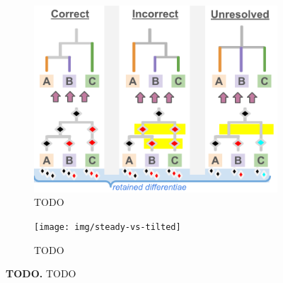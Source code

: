 \begin{figure}
  \centering
  \begin{subfigure}[b]{0.5\textwidth}
    \centering
    \includegraphics[width=\textwidth]{img/hstrat-failure-modes}
    \caption{TODO}
    \label{fig:example-TODO}
  \end{subfigure}%
  \begin{subfigure}[b]{0.5\textwidth}
    \centering
    \texttt{[image: img/steady-vs-tilted]}
    \caption{TODO}
    \label{fig:example-TODO}
  \end{subfigure}
  \caption{%
\textbf{TODO.}
TODO
  }
  \label{fig:example}
\end{figure}
